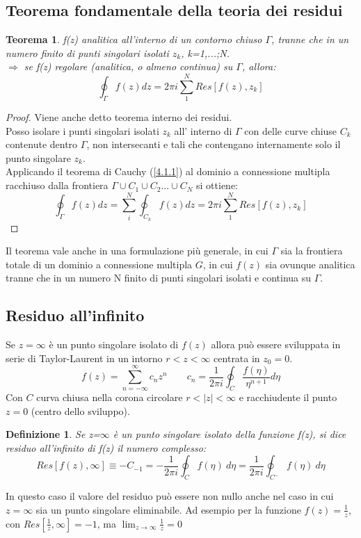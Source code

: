 \documentclass[twoside]{article}
\newtheorem{definition}{Definizione}[section]
\newtheorem{theorem}{Teorema}[section]
\begin{document}
\subsection{Teorema fondamentale della teoria dei residui}
\begin{theorem}\label{11 interno}
f(z) analitica all'interno di un contorno chiuso $\Gamma$, tranne che in un numero finito di punti singolari isolati $z_k$, k=1,...;N.\\
$\Longrightarrow$ se f(z) regolare (analitica, o almeno continua) su $\Gamma$, allora:
\begin{equation}
    \oint_\Gamma f(z)dz=2\pi i \sum_1^NRes[f(z),z_k]
\end{equation}
\end{theorem}
\begin{proof}
Viene anche detto teorema interno dei residui.\\
Posso isolare i punti singolari isolati $z_k$ all' interno di $\Gamma$ con delle curve chiuse $C_k$ contenute dentro $\Gamma$, non intersecanti e tali che contengano internamente solo il punto singolare $z_k$.\\
Applicando il teorema di Cauchy (\ref{4.1.1}) al dominio a connessione multipla racchiuso dalla frontiera $\Gamma\cup C_1\cup C_2...\cup C_N$ si ottiene:
\begin{equation}
    \oint_\Gamma f(z)dz=\sum_i^N\oint_{C_k}f(z)dz=2\pi i \sum_1^N Res[f(z),z_k]
\end{equation}
\end{proof}
Il teorema vale anche in una formulazione più generale, in cui $\Gamma$ sia la frontiera totale di un dominio a connessione multipla $G$, in cui $f(z)$ sia ovunque analitica tranne che in un numero N finito di punti singolari isolati e continua su $\Gamma$.


\subsection{Residuo all'infinito}
Se $z=\infty$ è un punto singolare isolato di $f(z)$ allora può essere sviluppata in serie di Taylor-Laurent in un intorno $r<z<\infty$ centrata in $z_0=0$.
\begin{equation}
    f(z)=\sum_{n=-\infty}^\infty c_nz^n \qquad c_n=\frac{1}{2\pi i}\oint_C \frac{f(\eta)}{\eta^{n+1}}d\eta
\end{equation}
Con $C$ curva chiusa nella corona circolare $r<|z|<\infty$ e racchiudente il punto $z=0$ (centro dello sviluppo).
\begin{definition}
Se z=$\infty$ è un punto singolare isolato della funzione f(z), si dice \textit{residuo all'infinito} di f(z) il numero complesso:
\begin{equation}
    Res[f(z),\infty]\equiv-C_{-1}=-\frac{1}{2\pi i}\oint_C f(\eta)\ d\eta=\frac{1}{2\pi i}\oint_{C^-} f(\eta)\ d\eta
\end{equation}
\end{definition}
In questo caso il valore del residuo può essere non nullo anche nel caso in cui $z=\infty$ sia un punto singolare eliminabile. Ad esempio per la funzione $f(z)=\frac{1}{z}$, con $Res[\frac{1}{z},\infty]=-1$, ma $\lim_{z\to\infty}\frac{1}{z}=0$
\end{document}
